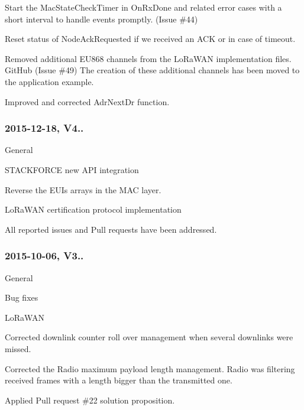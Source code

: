 \begin{DoxyItemize}
\begin{DoxyEnumerate}
\item Start the Mac\+State\+Check\+Timer in On\+Rx\+Done and related error cases with a short interval to handle events promptly. (Issue \#44)
\item Reset status of Node\+Ack\+Requested if we received an A\+CK or in case of timeout.
\item Removed additional E\+U868 channels from the Lo\+Ra\+W\+AN implementation files. Git\+Hub (Issue \#49) The creation of these additional channels has been moved to the application example.
\item Improved and corrected Adr\+Next\+Dr function.
\end{DoxyEnumerate}
\end{DoxyItemize}

\subsubsection*{2015-\/12-\/18, V4..}


\begin{DoxyItemize}
\item General
\begin{DoxyEnumerate}
\item S\+T\+A\+C\+K\+F\+O\+R\+CE new A\+PI integration
\item Reverse the E\+U\+Is arrays in the M\+AC layer.
\item Lo\+Ra\+W\+AN certification protocol implementation
\item All reported issues and Pull requests have been addressed.
\end{DoxyEnumerate}
\end{DoxyItemize}

\subsubsection*{2015-\/10-\/06, V3..}


\begin{DoxyItemize}
\item General
\begin{DoxyEnumerate}
\item Bug fixes
\end{DoxyEnumerate}
\item Lo\+Ra\+W\+AN
\begin{DoxyEnumerate}
\item Corrected downlink counter roll over management when several downlinks were missed.
\item Corrected the Radio maximum payload length management. Radio was filtering received frames with a length bigger than the transmitted one.
\item Applied Pull request \#22 solution proposition.
\end{DoxyEnumerate}
\end{DoxyItemize}

